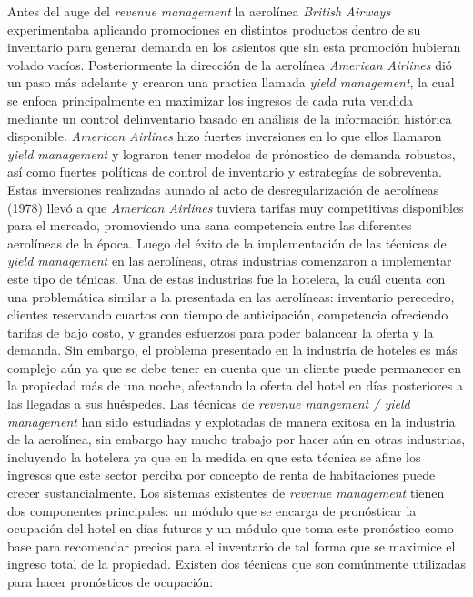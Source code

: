 Antes del auge del \emph{revenue management} la aerolínea \emph{British Airways} experimentaba aplicando promociones en distintos productos dentro de su inventario para generar demanda en los asientos que sin esta promoción hubieran volado vacíos. Posteriormente la dirección de la aerolínea \emph{American Airlines} dió un paso más adelante y crearon una practica llamada \emph{yield management}, la cual se enfoca principalmente en maximizar los ingresos de cada ruta vendida mediante un control delinventario basado en análisis de la información histórica disponible. \emph{American Airlines} hizo fuertes inversiones en lo que ellos llamaron \emph{yield management} y lograron tener modelos de prónostico de demanda robustos, así como fuertes políticas de control de inventario y estrategías de sobreventa. Estas inversiones realizadas aunado al acto de desregularización de aerolíneas (1978) llevó a que \emph{American Airlines} tuviera tarifas muy competitivas disponibles para el mercado, promoviendo una sana competencia entre las diferentes aerolíneas de la época.
Luego del éxito de la implementación de las técnicas de \emph{yield management} en las aerolíneas, otras industrias comenzaron a implementar este tipo de ténicas. Una de estas industrias fue la hotelera, la cuál cuenta con una problemática similar a la presentada en las aerolíneas: inventario perecedro, clientes reservando cuartos con tiempo de anticipación, competencia ofreciendo tarifas de bajo costo, y grandes esfuerzos para poder balancear la oferta y la demanda. Sin embargo, el problema presentado en la industria de hoteles es más complejo aún ya que se debe tener en cuenta que un cliente puede permanecer en la propiedad más de una noche, afectando la oferta del hotel en días posteriores a las llegadas a sus huéspedes.
Las técnicas de \emph{revenue mangement / yield management} han sido estudiadas y explotadas de manera exitosa en la industria de la aerolínea, sin embargo hay mucho trabajo por hacer aún en otras industrias, incluyendo la hotelera ya que en la medida en que esta técnica se afine los ingresos que este sector perciba por concepto de renta de habitaciones puede crecer sustancialmente.
Los sistemas existentes de \emph{revenue management} tienen dos componentes principales: un módulo que se encarga de pronósticar la ocupación del hotel en días futuros y un módulo que toma este pronóstico como base para recomendar precios para el inventario de tal forma que se maximice el ingreso total de la propiedad. Existen dos técnicas que son comúnmente utilizadas para hacer pronósticos de ocupación:
